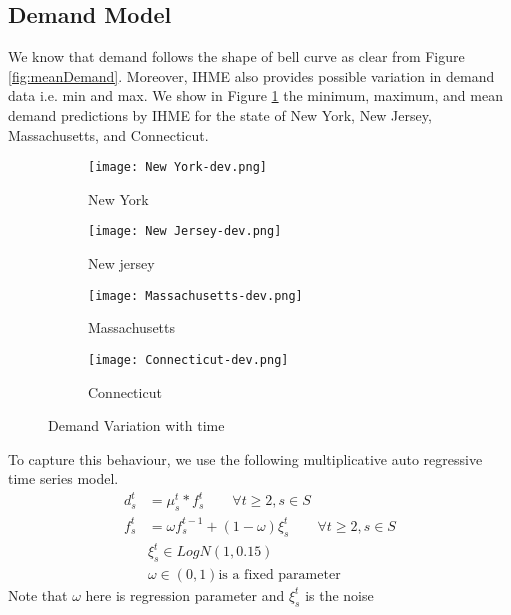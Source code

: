 \documentclass[11pt,letterpaper]{article}
\begin{document}
\subsection{Demand Model}
We know that demand follows the shape of bell curve as clear from Figure \ref{fig:meanDemand}. Moreover, IHME also provides possible variation in demand data i.e. min and max. We show in Figure \ref{fig:demandVariation} the minimum, maximum, and mean demand predictions by IHME for the state of New York, New Jersey, Massachusetts, and Connecticut.
\begin{figure}[h!]
  \centering
  \begin{subfigure}[b]{0.45\linewidth}
    \texttt{[image: New York-dev.png]}
    \caption{New York}
  \end{subfigure}
  \begin{subfigure}[b]{0.45\linewidth}
    \texttt{[image: New Jersey-dev.png]}
    \caption{New jersey}
  \end{subfigure}
  \begin{subfigure}[b]{0.45\linewidth}
    \texttt{[image: Massachusetts-dev.png]}
    \caption{Massachusetts}
  \end{subfigure}
  \begin{subfigure}[b]{0.45\linewidth}
    \texttt{[image: Connecticut-dev.png]}
    \caption{Connecticut}
  \end{subfigure}
  
  \caption{Demand Variation with time}
  \label{fig:demandVariation}
\end{figure}
\newline 
To capture this behaviour, we use the following multiplicative auto regressive time series model. 
\begin{align}
d^t_{s}&=\mu^{t}_{s}*f^t_s \qquad \forall t\ge 2,s\in S\\
f^t_s&=\omega f^{t-1}_s+(1-\omega)\xi^t_s \qquad \forall t\ge 2, s\in S\\
&\xi^t_s\in LogN(1,0.15)\\
&\omega\in (0,1) \text{is a fixed parameter}
\end{align}
Note that $\omega$ here is regression parameter and $\xi^t_s$ is the noise
\end{document}
